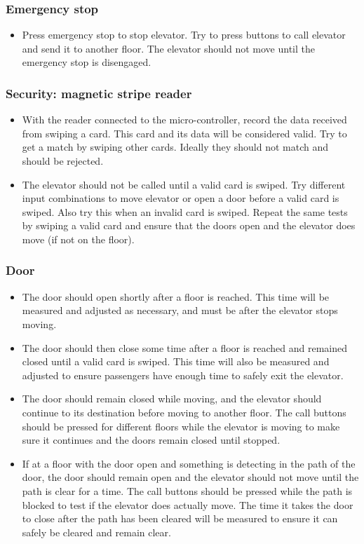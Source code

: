 \documentclass{article}
\begin{document}
	    \subsubsection{Emergency stop}
	    \begin{itemize}
	        \item Press emergency stop to stop elevator. Try to press buttons to call elevator and send it to another floor. The elevator should not move until the emergency stop is disengaged.
	    \end{itemize}
	    
	    \subsubsection{Security: magnetic stripe reader}
	    \begin{itemize}
	        \item With the reader connected to the micro-controller, record the data received from swiping a card. This card and its data will be considered valid. Try to get a match by swiping other cards. Ideally they should not match and should be rejected.
	        \item The elevator should not be called until a valid card is swiped. Try different input combinations to move elevator or open a door before a valid card is swiped. Also try this when an invalid card is swiped. Repeat the same tests by swiping a valid card and ensure that the doors open and the elevator does move (if not on the floor).
	    \end{itemize}
	    
	    \subsubsection{Door}
	    \begin{itemize}
	        \item The door should open shortly after a floor is reached. This time will be measured and adjusted as necessary, and must be after the elevator stops moving.
	        \item The door should then close some time after a floor is reached and remained closed until a valid card is swiped. This time will also be measured and adjusted to ensure passengers have enough time to safely exit the elevator.
	        \item The door should remain closed while moving, and the elevator should continue to its destination before moving to another floor. The call buttons should be pressed for different floors while the elevator is moving to make sure it continues and the doors remain closed until stopped.
	        \item If at a floor with the door open and something is detecting in the path of the door, the door should remain open and the elevator should not move until the path is clear for a time. The call buttons should be pressed while the path is blocked to test if the elevator does actually move. The time it takes the door to close after the path has been cleared will be measured to ensure it can safely be cleared and remain clear.
	    \end{itemize}
	    
\end{document}
